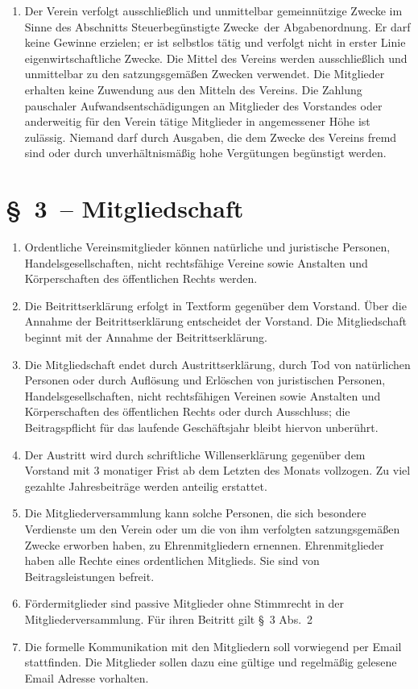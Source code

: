 \documentclass[11pt,DIV12]{scrartcl}
\begin{document}
\begin{enumerate}
\item Der Verein verfolgt ausschließlich und unmittelbar gemeinnützige Zwecke im Sinne des Abschnitts \glqq Steuerbegünstigte Zwecke\grqq\ der Abgabenordnung. Er darf keine Gewinne erzielen; er ist selbstlos tätig und verfolgt nicht in erster Linie eigenwirtschaftliche Zwecke. Die Mittel des Vereins werden ausschließlich und unmittelbar zu den satzungsgemäßen Zwecken verwendet. Die Mitglieder erhalten keine Zuwendung aus den Mitteln des Vereins. Die Zahlung pauschaler Aufwandsentschädigungen an Mitglieder des Vorstandes oder anderweitig für den Verein tätige Mitglieder in angemessener Höhe ist zulässig. Niemand darf durch Ausgaben, die dem Zwecke des Vereins fremd sind oder durch unverhältnismäßig hohe Vergütungen begünstigt werden.
\end{enumerate}

\section*{§~3~-- Mitgliedschaft}
\begin{enumerate}
\item Ordentliche Vereinsmitglieder können natürliche und juristische Personen, Handelsgesellschaften, nicht rechtsfähige Vereine sowie Anstalten und Körperschaften des öffentlichen Rechts werden.
\item Die Beitrittserklärung erfolgt in Textform gegenüber dem Vorstand. Über die Annahme der Beitrittserklärung entscheidet der Vorstand. Die Mitgliedschaft beginnt mit der Annahme der Beitrittserklärung.
\item Die Mitgliedschaft endet durch Austrittserklärung, durch Tod von natürlichen Personen oder durch Auflösung und Erlöschen von juristischen Personen, Handelsgesellschaften, nicht rechtsfähigen Vereinen sowie Anstalten und Körperschaften des öffentlichen Rechts oder durch Ausschluss; die Beitragspflicht für das laufende Geschäftsjahr bleibt hiervon unberührt.
\item Der Austritt wird durch schriftliche Willenserklärung gegenüber dem Vorstand mit 3 monatiger Frist ab dem Letzten des Monats vollzogen. Zu viel gezahlte Jahresbeiträge werden anteilig erstattet.
\item Die Mitgliederversammlung kann solche Personen, die sich besondere Verdienste um den Verein oder um die von ihm verfolgten satzungsgemäßen Zwecke erworben haben, zu Ehrenmitgliedern ernennen. Ehrenmitglieder haben alle Rechte eines ordentlichen Mitglieds. Sie sind von Beitragsleistungen befreit.
\item Fördermitglieder sind passive Mitglieder ohne Stimmrecht in der Mitgliederversammlung. Für ihren Beitritt gilt §~3 Abs.~2
\item Die formelle Kommunikation mit den Mitgliedern soll vorwiegend per Email stattfinden. Die Mitglieder sollen dazu eine gültige und regelmäßig gelesene Email Adresse vorhalten.
\end{enumerate}
\end{document}
